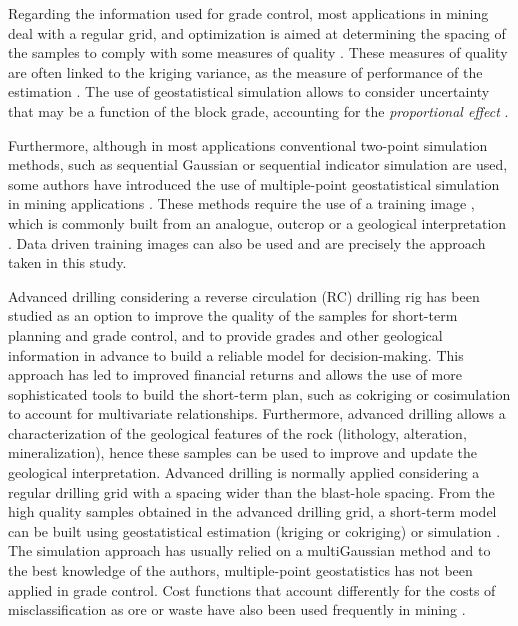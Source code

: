 Regarding the information used for grade control, most applications in mining deal with a regular grid, and optimization is aimed at determining the spacing of the samples to comply with some measures of quality \citep{Ortiz2014}. These measures of quality are often linked to the kriging variance, as the measure of performance of the estimation \citep{McBratney1981a,McBratney1981b,Blackwell1998,Lloyd1998,Hassanipak2004,Vasat2010}. The use of geostatistical simulation allows to consider uncertainty that may be a function of the block grade, accounting for the \emph{proportional effect} \citep{Journel2004}. 

Furthermore, although in most applications conventional two-point simulation methods, such as sequential Gaussian or sequential indicator simulation are used, some authors have introduced the use of multiple-point geostatistical simulation in mining applications \citep{Ortiz2003,Ortiz_2004_a,Boisvert2008}. These methods require the use of a training image \citep{Mariethoz_2014_a}, which is commonly built from an analogue, outcrop or a geological interpretation \citep{Boisvert2008}. Data driven training images can also be used \citep{Ortiz_2004_a,Silva2015} and are precisely the approach taken in this study.

Advanced drilling considering a reverse circulation (RC) drilling rig has been studied as an option to improve the quality of the samples for short-term planning and grade control, and to provide grades and other geological information in advance to build a reliable model for decision-making. This approach has led to improved financial returns \citep{Magri2010,Magri2011,Ortiz2012,Ortiz2014} and allows the use of more sophisticated tools to build the short-term plan, such as cokriging or cosimulation to account for multivariate relationships. Furthermore, advanced drilling allows a characterization of the geological features of the rock (lithology, alteration, mineralization), hence these samples can be used to improve and update the geological interpretation. Advanced drilling is normally applied considering a regular drilling grid with a spacing wider than the blast-hole spacing. From the high quality samples obtained in the advanced drilling grid, a short-term model can be built using geostatistical estimation (kriging or cokriging) or simulation \citep{Journel1974}. The simulation approach has usually relied on a multiGaussian method and to the best knowledge of the authors, multiple-point geostatistics has not been applied in grade control. Cost functions that account differently for the costs of misclassification as ore or waste have also been used frequently in mining \citep{Deutsch2000,Journel2004,Verly2005,Dimitrak2014}. 

